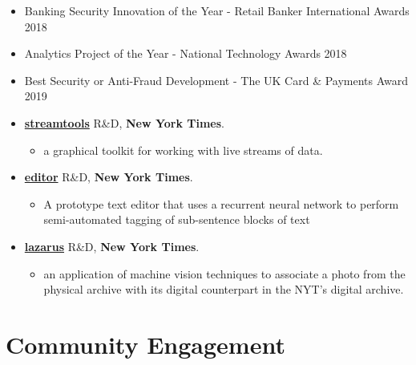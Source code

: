\documentclass[line, overlapped]{res}
\begin{document}
\begin{resume}
\begin{itemize}
  \begin{itemize}
  \item
    Banking Security Innovation of the Year - Retail Banker
    International Awards 2018
  \item
    Analytics Project of the Year - National Technology Awards 2018
  \item
    Best Security or Anti-Fraud Development - The UK Card \& Payments
    Award 2019
  \end{itemize}
\end{itemize}
\newpage
\begin{itemize}
\item
	\href{https://github.com/nytlabs/streamtools}{\textbf{streamtools}} R\&D, \textbf{New York Times}.
	\begin{itemize}
		\item a graphical toolkit for working with live streams of data.
	\end{itemize}
\item
	\href{http://nytlabs.com/projects/editor.html}{\textbf{editor}} R\&D, \textbf{New York Times}.
	\begin{itemize}
		\item A prototype text editor that uses a recurrent neural network to perform semi-automated tagging of sub-sentence blocks of text
	\end{itemize}
\item
	\href{http://nytlabs.com/projects/lazarus.html}{\textbf{lazarus}} R\&D, \textbf{New York Times}.
	\begin{itemize}
		\item an application of machine vision techniques to associate a photo from the physical archive with its digital counterpart in the NYT's digital archive.
	\end{itemize}
\end{itemize}

\section{Community Engagement}


\end{resume}
\end{document}
